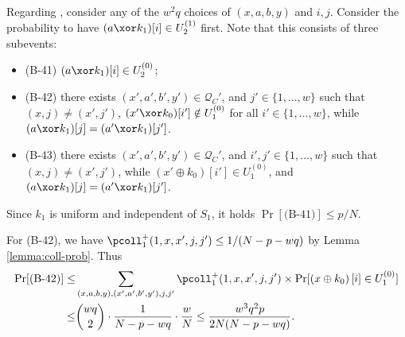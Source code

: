 
\newpage


Regarding \bfour, consider any of the $w^2q$ choices of $(x,a,b,y)$ and $i, j$. Consider the probability to have $(a\xor k_1)[i]\in U_2^{(1)}$ first. Note that this consists of three subevents:
\begin{itemize}
	\item(B-41) $(a\xor k_1)[i]\in U_2^{(0)}$;
	\item(B-42) there exists $(x',a',b',y')\in\mathcal{Q}_{C}'$, and $j'\in\{1,\ldots,w\}$ such that $(x,j)\neq(x',j')$, $(x'\xor k_0)[i']\notin U_1^{(0)}$ for all $i'\in\{1,\ldots,w\}$, while $(a\xor k_1)[j]=(a'\xor k_1)[j']$.
	\item(B-43) there exists $(x',a',b',y')\in\mathcal{Q}_{C}'$, and $i',j'\in\{1,\ldots,w\}$ such that $(x,j)\neq(x',j')$, while $\left(x' \oplus k_{0}\right)[i']\in U_1^{(0)}$, and $(a\xor k_1)[j]=(a'\xor k_1)[j']$.
\end{itemize}
Since $k_1$ is uniform and independent of $S_1$, it holds $\Pr[\text{(B-41)}]\leq p/N$.






For (B-42), we have $\pcoll_{1}^+(1,x,x',j,j')\leq1/(N-p-wq)$ by Lemma \ref{lemma:coll-prob}. Thus
%
\begin{align*}
\Pr[\text{(B-42)}] \leq  & \sum_{(x,a,b,y),(x',a',b',y'),j,j'}\pcoll_{1}^+(1,x,x',j,j')\times\Pr[\left(x \oplus k_{0}\right)[i]\in U_1^{(0)}]          \\
\leq  &  {wq\choose2}\cdot \frac{1}{N-p-wq}\cdot\frac{w}{N} \leq \frac{w^3q^2p}{2N(N-p-wq)} .
\end{align*}


